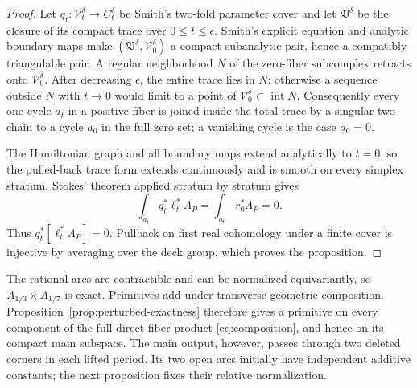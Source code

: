 \documentclass[11pt,reqno]{amsart}
\theoremstyle{plain}
\theoremstyle{definition}
\begin{document}
\begin{proof}
Let $q_t:\mathcal V_t^\delta\to C_t^\delta$ be Smith's two-fold parameter cover and let
$\mathfrak V^\delta$ be the closure of its compact trace over $0\le t\le\epsilon$.  Smith's
explicit equation and analytic boundary maps make
$(\mathfrak V^\delta,\mathcal V_0^\delta)$ a compact subanalytic pair, hence a compatibly
triangulable pair.  A regular neighborhood $N$ of the zero-fiber subcomplex retracts onto
$\mathcal V_0^\delta$.  After decreasing $\epsilon$, the entire trace lies in $N$: otherwise a
sequence outside $N$ with $t\to0$ would limit to a point of
$\mathcal V_0^\delta\subset\operatorname{int}N$.  Consequently every one-cycle
$\widetilde a_t$ in a positive fiber is joined inside the total trace by a singular two-chain to
a cycle $a_0$ in the full zero set; a vanishing cycle is the case $a_0=0$.

The Hamiltonian graph and all boundary maps extend analytically to $t=0$, so the pulled-back trace
form extends continuously and is smooth on every simplex stratum.  Stokes' theorem applied
stratum by stratum gives
\[
 \int_{\widetilde a_t}q_t^*\ell_t^*\Lambda_P
 =\int_{a_0}r_0^*\Lambda_P=0.
\]
Thus $q_t^*[\ell_t^*\Lambda_P]=0$.  Pullback on first real cohomology under a finite cover is
injective by averaging over the deck group, which proves the proposition.
\end{proof}

The rational arcs are contractible and can be normalized equivariantly, so
$A_{1/3}\times A_{1/7}$ is exact.  Primitives add under transverse geometric composition.
Proposition~\ref{prop:perturbed-exactness} therefore gives a primitive on every component of the
full direct fiber product \eqref{eq:composition}, and hence on its compact main subspace.  The main
output, however, passes through two deleted
corners in each lifted period.  Its two open arcs initially have independent additive constants;
the next proposition fixes their relative normalization.
\end{document}
